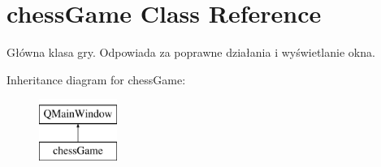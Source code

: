 \hypertarget{classchess_game}{}\section{chess\+Game Class Reference}
\label{classchess_game}


Główna klasa gry. Odpowiada za poprawne działania i wyświetlanie okna.  


Inheritance diagram for chess\+Game\+:\begin{figure}[H]
\begin{center}
\leavevmode
\includegraphics[height=2.000000cm]{classchess_game}
\end{center}
\end{figure}
